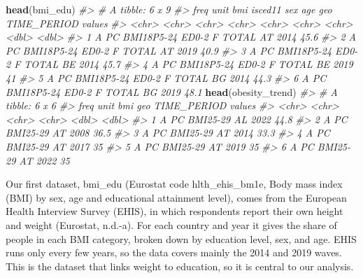 \documentclass[
]{article}
\newenvironment{Shaded}{\begin{snugshade}}{\end{snugshade}}
\newcommand{\CommentTok}[1]{\textcolor[rgb]{0.56,0.35,0.01}{\textit{#1}}}
\newcommand{\FunctionTok}[1]{\textcolor[rgb]{0.13,0.29,0.53}{\textbf{#1}}}
\newcommand{\NormalTok}[1]{#1}
\begin{document}
\begin{Shaded}
\begin{Highlighting}[]
\FunctionTok{head}\NormalTok{(bmi\_edu)}
\CommentTok{\#\textgreater{} \# A tibble: 6 x 9}
\CommentTok{\#\textgreater{}   freq  unit  bmi        isced11 sex   age   geo   TIME\_PERIOD values}
\CommentTok{\#\textgreater{}   \textless{}chr\textgreater{} \textless{}chr\textgreater{} \textless{}chr\textgreater{}      \textless{}chr\textgreater{}   \textless{}chr\textgreater{} \textless{}chr\textgreater{} \textless{}chr\textgreater{}       \textless{}dbl\textgreater{}  \textless{}dbl\textgreater{}}
\CommentTok{\#\textgreater{} 1 A     PC    BMI18P5{-}24 ED0{-}2   F     TOTAL AT           2014   45.6}
\CommentTok{\#\textgreater{} 2 A     PC    BMI18P5{-}24 ED0{-}2   F     TOTAL AT           2019   40.9}
\CommentTok{\#\textgreater{} 3 A     PC    BMI18P5{-}24 ED0{-}2   F     TOTAL BE           2014   45.7}
\CommentTok{\#\textgreater{} 4 A     PC    BMI18P5{-}24 ED0{-}2   F     TOTAL BE           2019   41  }
\CommentTok{\#\textgreater{} 5 A     PC    BMI18P5{-}24 ED0{-}2   F     TOTAL BG           2014   44.3}
\CommentTok{\#\textgreater{} 6 A     PC    BMI18P5{-}24 ED0{-}2   F     TOTAL BG           2019   48.1}
\FunctionTok{head}\NormalTok{(obesity\_trend)}
\CommentTok{\#\textgreater{} \# A tibble: 6 x 6}
\CommentTok{\#\textgreater{}   freq  unit  bmi      geo   TIME\_PERIOD values}
\CommentTok{\#\textgreater{}   \textless{}chr\textgreater{} \textless{}chr\textgreater{} \textless{}chr\textgreater{}    \textless{}chr\textgreater{}       \textless{}dbl\textgreater{}  \textless{}dbl\textgreater{}}
\CommentTok{\#\textgreater{} 1 A     PC    BMI25{-}29 AL           2022   44.8}
\CommentTok{\#\textgreater{} 2 A     PC    BMI25{-}29 AT           2008   36.5}
\CommentTok{\#\textgreater{} 3 A     PC    BMI25{-}29 AT           2014   33.3}
\CommentTok{\#\textgreater{} 4 A     PC    BMI25{-}29 AT           2017   35  }
\CommentTok{\#\textgreater{} 5 A     PC    BMI25{-}29 AT           2019   35  }
\CommentTok{\#\textgreater{} 6 A     PC    BMI25{-}29 AT           2022   35}
\end{Highlighting}
\end{Shaded}

Our first dataset, bmi\_edu (Eurostat code hlth\_ehis\_bm1e, Body mass
index (BMI) by sex, age and educational attainment level), comes from
the European Health Interview Survey (EHIS), in which respondents report
their own height and weight (Eurostat, n.d.-a). For each country and
year it gives the share of people in each BMI category, broken down by
education level, sex, and age. EHIS runs only every few years, so the
data covers mainly the 2014 and 2019 waves. This is the dataset that
links weight to education, so it is central to our analysis.
\end{document}
